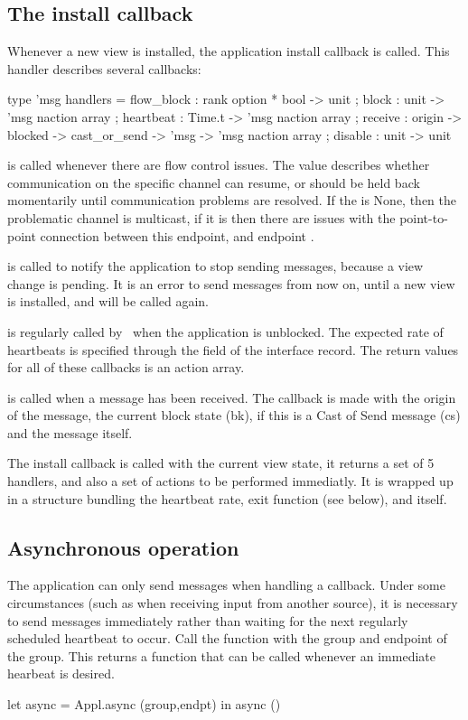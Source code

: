 \subsection{The install callback}
Whenever a new view is installed, the application install callback is 
called. This handler describes several callbacks:
\begin{codebox}
  type 'msg handlers = {
    flow_block : rank option * bool -> unit ;
    block : unit -> 'msg naction array ;
    heartbeat : Time.t -> 'msg naction array ;
    receive : origin -> blocked -> cast_or_send -> 'msg -> 'msg naction array ;
    disable : unit -> unit
  } 
\end{codebox}

 is called whenever there are flow control
issues. The  value describes whether communication on the
specific channel can resume, or should be held back momentarily until 
communication problems are resolved. If the  is None,
then the problematic channel is multicast, if it is
 then there are issues with the point-to-point
connection between this endpoint, and endpoint .

 is called to notify the application to stop sending
messages, because a view change is pending. It is an error to send
messages from now on, until a new view is installed, and
 will be called again.

 is regularly called by \ensemble\ when
the application is unblocked.  The expected rate of heartbeats is
specified through the  field of the interface
record.  The return values for all of these callbacks is an action
array.

 is called when a message
has been received. The callback is made with the origin of the 
message, the current block state (bk), if this is a Cast of Send
message (cs) and the message itself.

The install callback is called with the current view state, it returns
a set of 5 handlers, and also a set of actions to be performed
immediatly. It is wrapped up in a structure bundling the heartbeat
rate, exit function (see below), and itself.




\subsection{Asynchronous operation}
The application can only send messages when handling a callback.
Under some circumstances (such as when receiving input from another
source), it is necessary to send messages immediately rather than
waiting for the next regularly scheduled heartbeat to occur.  Call the
function  with the group and endpoint of the group.
This returns a function that can be called whenever an immediate
hearbeat is desired.  
\begin{codebox}
  let async = Appl.async (group,endpt) in
  async ()
\end{codebox}


